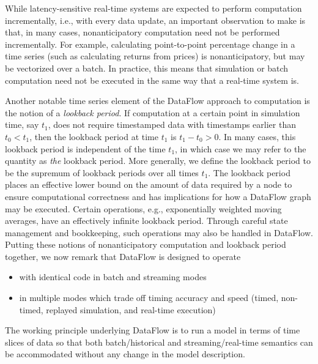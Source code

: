 \documentclass[11pt, reqno]{amsart}
\theoremstyle{definition}
\theoremstyle{remark}
\begin{document}
While latency-sensitive real-time systems are expected to perform computation
incrementally, i.e., with every data update, an important observation to make
is that, in many cases, nonanticipatory computation need not be performed
incrementally. For example, calculating point-to-point percentage change in a
time series (such as calculating returns from prices) is nonanticipatory, but
may be vectorized over a batch. In practice, this means that simulation or
batch computation need not be executed in the same way that a real-time
system is.

Another notable time series element of the DataFlow approach to computation is
the notion of a \emph{lookback period}. If computation at a certain point in
simulation time, say $t_1$, does not require timestamped data with timestamps
earlier than $t_0 < t_1$, then the lookback period at time $t_1$ is
$t_1 - t_0 > 0$. In many cases, this lookback period is independent of the
time $t_1$, in which case we may refer to the quantity as \emph{the} lookback
period. More generally, we define the lookback period to be the supremum of
lookback periods over all times $t_1$. The lookback period places an effective
lower bound on the amount of data required by a node to ensure computational
correctness and has implications for how a DataFlow graph may be executed.
Certain operations, e.g., exponentially weighted moving averages, have an
effectively infinite lookback period. Through careful state management and
bookkeeping, such operations may also be handled in DataFlow.
  Putting these notions of nonanticipatory computation and lookback period
together, we now remark that DataFlow is designed to operate
  \begin{itemize}
    \item with identical code in batch and streaming modes

    \item in multiple modes which trade off timing accuracy and speed (timed,
      non-timed, replayed simulation, and real-time execution)
  \end{itemize}

  The working principle underlying DataFlow is to run a model in terms of time
  slices of data so that both batch/historical and streaming/real-time semantics
  can be accommodated without any change in the model description.
\end{document}
